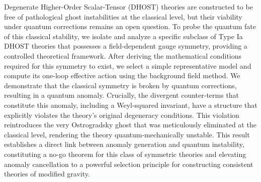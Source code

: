 \documentclass[twocolumn]{aastex631}
\begin{document}
Degenerate Higher-Order Scalar-Tensor (DHOST) theories are constructed to be free of pathological ghost instabilities at the classical level, but their viability under quantum corrections remains an open question. To probe the quantum fate of this classical stability, we isolate and analyze a specific subclass of Type Ia DHOST theories that possesses a field-dependent gauge symmetry, providing a controlled theoretical framework. After deriving the mathematical conditions required for this symmetry to exist, we select a simple representative model and compute its one-loop effective action using the background field method. We demonstrate that the classical symmetry is broken by quantum corrections, resulting in a quantum anomaly. Crucially, the divergent counter-terms that constitute this anomaly, including a Weyl-squared invariant, have a structure that explicitly violates the theory's original degeneracy conditions. This violation reintroduces the very Ostrogradsky ghost that was meticulously eliminated at the classical level, rendering the theory quantum-mechanically unstable. This result establishes a direct link between anomaly generation and quantum instability, constituting a no-go theorem for this class of symmetric theories and elevating anomaly cancellation to a powerful selection principle for constructing consistent theories of modified gravity.
\end{document}
